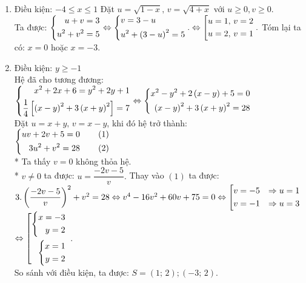 \begin{ex}
{\begin{enumerate}
        \item Điều kiện: $ -4 \leq x \leq 1 $
        Đặt $ u = \sqrt{1 - x}, \, v = \sqrt{4 + x} $ với $ u \geq 0, v \geq 0 $. \\Ta được: 
        $\left\{\begin{aligned}u + v &=3\\ u^2 + v^2 &=5\end{aligned}\right. \Leftrightarrow \left\{\begin{aligned}&v= 3-u\\& u^2 + \left(3-u\right)^2=5\end{aligned}\right..\\
        \Leftrightarrow \left[\begin{aligned}u= 1, \, v = 2\\
        	u = 2, \, v = 1\end{aligned}\right..$
        Tóm lại ta có: $ x = 0 $ hoặc $ x = -3 $.
        \item Điều kiện: $ y \geq -1 $ \\
        Hệ đã cho tương đương:\\
        $ \left\{\begin{aligned}x^2+2x+6=y^2+2y+1\\
        \dfrac{1}{4} \left[ \left(x-y\right)^2+3 \left(x+y\right)^2\right] = 7\end{aligned}\right. \Leftrightarrow 
    \left\{\begin{aligned}x^2-y^2 + 2\left(x-y\right) + 5 = 0\\
        \left(x-y\right)^2+3 \left(x+y\right)^2 = 28\end{aligned}\right.$ \\
    Đặt $ u = x + y, \, v = x - y $, khi đó hệ trở thành:\\
$    
		\left\{\begin{aligned}
				uv + 2v + 5 = 0 & \qquad \left(1\right)\\
			3u^2+v^2=28 & \qquad  \left(2\right)
		\end{aligned}\right.
		$ \\
   * Ta thấy $ v = 0 $ không thỏa hệ. \\
   * $ v \neq 0 $ ta được: $ u = \dfrac{-2v-5}{v}. $ Thay vào $ \left(1\right) $  ta được: $ \\ 3.\left(\dfrac{-2v-5}{v}\right)^2+v^2=28 \Leftrightarrow v^4-16v^2+60v+75=0 \Leftrightarrow  \left[\begin{aligned}&v = -5 & \Rightarrow u = 1\\&v=-1 &\Rightarrow u = 3\end{aligned}\right. $  \\
   $ \Leftrightarrow \left[\begin{aligned}\left\{\begin{aligned}x = -3 \\ y = 2\end{aligned}\right. \\ \left\{\begin{aligned}x = 1\\ y = 2\end{aligned}\right.\end{aligned}\right. $
        . \\
        So sánh với điều kiện, ta được: $ S = \left(1;\,2\right); \left(-3;\,2\right).  $
    \end{enumerate}
    }
\end{ex}

